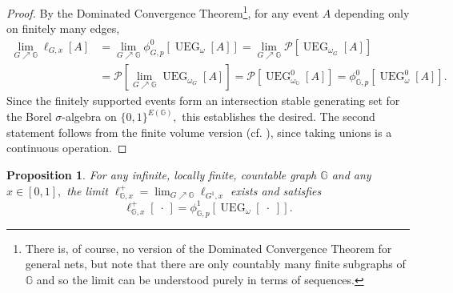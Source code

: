 \documentclass[article,11pt,reqno]{amsart}
\newtheorem{proposition}[theorem]{Proposition}
\begin{document}
\begin{appendix}
\begin{proof}
By the Dominated Convergence Theorem\footnote{There is, of course, no version of the Dominated Convergence Theorem for general nets, but note that there are only countably many finite subgraphs of $\mathbb{G}$ and so the limit can be understood purely in terms of sequences.}, for any event $A$ depending only on finitely many edges,
\begin{align*}
  \lim_{G\nearrow \mathbb{G}}\ell_{G,x}[A] &=\lim_{G\nearrow \mathbb{G}}\phi^0_{G,p}[\operatorname{UEG}_{\omega}[A]] =\lim_{G\nearrow \mathbb{G}} \mathcal{P}[\operatorname{UEG}_{\omega_G}[A]] \\
  &=\mathcal{P}[\lim_{G\nearrow \mathbb{G}} \operatorname{UEG}_{\omega_G}[A]]=\mathcal{P}[\operatorname{UEG}^0_{\omega_{\mathbb{G}}}[A]]=\phi^0_{\mathbb{G},p}[\operatorname{UEG}^0_{\omega}[A]].  
\end{align*}
Since the finitely supported events form an intersection stable generating set for the Borel $\sigma$-algebra on $\{0,1\}^{E(\mathbb{G})},$ this establishes the desired. The second statement follows from the finite volume version (cf. ), since taking unions is a continuous operation.
\end{proof}


\begin{proposition}\label{prop:general_loop_O(1)_thermodynamic_limit_wired}
For any infinite, locally finite, countable graph $\mathbb{G}$ and any $x\in [0,1],$ the limit 
$
\ell^+_{\mathbb{G},x}=\lim_{G\nearrow \mathbb{G}}\ell_{G^1,x}
$ exists and satisfies
$$
\ell^+_{\mathbb{G},x}[\;\cdot\,]=\phi_{\mathbb{G},p}^1[\operatorname{UEG}_\omega[\;\cdot\;]].
$$


\end{proposition}
\end{appendix}
\end{document}
